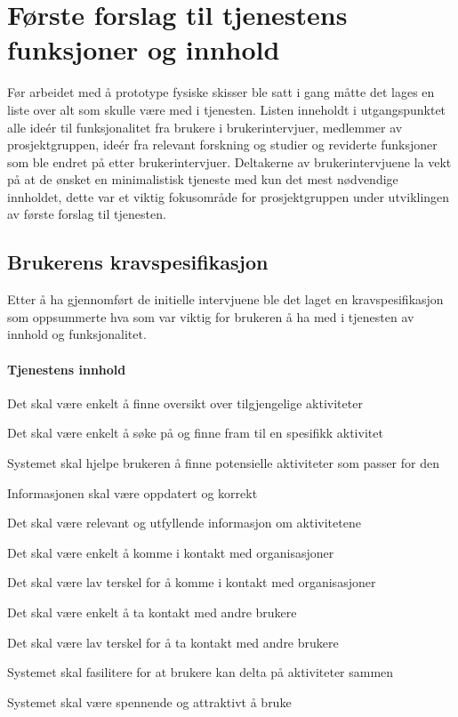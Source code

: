\section{Første forslag til tjenestens funksjoner og innhold}

Før arbeidet med å prototype fysiske skisser ble satt i gang måtte det lages en liste over alt som skulle være med i tjenesten. Listen inneholdt i utgangspunktet alle ideér til funksjonalitet fra brukere i brukerintervjuer, medlemmer av prosjektgruppen, ideér fra relevant forskning og studier og reviderte funksjoner som ble endret på etter brukerintervjuer. Deltakerne av brukerintervjuene la vekt på at de ønsket en minimalistisk tjeneste med kun det mest nødvendige innholdet, dette var et viktig fokusområde for prosjektgruppen under utviklingen av første forslag til tjenesten.

\subsection{Brukerens kravspesifikasjon}
\label{section:kravspec}
Etter å ha gjennomført de initielle intervjuene ble det laget en kravspesifikasjon som oppsummerte hva som var viktig for brukeren å ha med i tjenesten av innhold og funksjonalitet.

\paragraph{Tjenestens innhold}
\begin{compactitem}
\item Det skal være enkelt å finne oversikt over tilgjengelige aktiviteter
\item Det skal være enkelt å søke på og finne fram til en spesifikk aktivitet
\item Systemet skal hjelpe brukeren å finne potensielle aktiviteter som passer for den
\item Informasjonen skal være oppdatert og korrekt
\item Det skal være relevant og utfyllende informasjon om aktivitetene
\item Det skal være enkelt å komme i kontakt med organisasjoner
\item Det skal være lav terskel for å komme i kontakt med organisasjoner
\item Det skal være enkelt å ta kontakt med andre brukere
\item Det skal være lav terskel for å ta kontakt med andre brukere
\item Systemet skal fasilitere for at brukere kan delta på aktiviteter sammen
\item Systemet skal være spennende og attraktivt å bruke
\end{compactitem}

